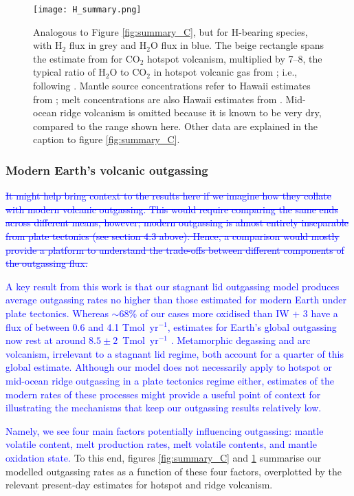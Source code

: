 \documentclass[3p,authoryear]{elsarticle}
\newcommand{\editthree}[2]{\textcolor{blue}{\sout{#1}#2}}
\begin{document}
\begin{figure}
\centering\texttt{[image: H\_summary.png]}
\caption{\label{fig:summary_H}Analogous to Figure \ref{fig:summary_C}, but for H-bearing species, with H$_2$ flux in grey and H$_2$O flux in blue. The beige rectangle spans the estimate from \citet{DASGUPTA2010} for CO$_2$ hotspot volcanism, multiplied by 7--8, the typical ratio of H$_2$O to CO$_2$ in hotspot volcanic gas from \citet{Holland1984}; i.e., following \citet{Catling2017}. Mantle source concentrations refer to Hawaii estimates from \citet{Wallace1998}; melt concentrations are also Hawaii estimates from \citet{WallaceAnderson1998}. Mid-ocean ridge volcanism is omitted because it is known to be very dry, compared to the range shown here. Other data are explained in the caption to figure \ref{fig:summary_C}.}
\end{figure}

\subsubsection{Modern Earth's volcanic outgassing}

\editthree{It might help bring context to the results here if we imagine how they collate with modern volcanic outgassing. This would require comparing the same ends across different means, however; modern outgassing is almost entirely inseparable from plate tectonics (see section 4.3 above). Hence, a comparison would mostly provide a platform to understand the trade-offs between different components of the outgassing flux.}{}

\editthree{}{A key result from this work is that our stagnant lid outgassing model produces average outgassing rates no higher than those estimated for modern Earth under plate tectonics. Whereas $\sim$68\% of our cases more oxidised than IW + 3 have a \ch{CO2} flux of between 0.6 and 4.1 Tmol~yr$^{-1}$, estimates for Earth's global \ch{CO2} outgassing now rest at around $8.5 \pm 2$~Tmol~yr$^{-1}$ \citep{Catling2017}. Metamorphic degassing and arc volcanism, irrelevant to a stagnant lid regime, both account for a quarter of this global estimate. Although our model does not necessarily apply to hotspot or mid-ocean ridge outgassing in a plate tectonics regime either, estimates of the modern rates of these processes might provide a useful point of context for illustrating the mechanisms that keep our outgassing results relatively low.}



\editthree{}{Namely, we see four main factors potentially influencing outgassing: mantle volatile content, melt production rates, melt volatile contents, and mantle oxidation state.} To this end, figures \ref{fig:summary_C} and \ref{fig:summary_H} summarise our modelled outgassing rates as a function of these four factors, overplotted by the relevant present-day estimates for hotspot and ridge volcanism. 
\end{document}
